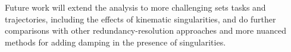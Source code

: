 \documentclass[../main.tex]{subfiles}
\begin{document}
Future work will extend the analysis to more challenging sets tasks and trajectories, including the effects of kinematic singularities, and do further comparisons with other redundancy-resolution approaches and more nuanced methods for adding damping in the presence of singularities.








\ifSubfilesClassLoaded{%
  
  
}{}
\end{document}
